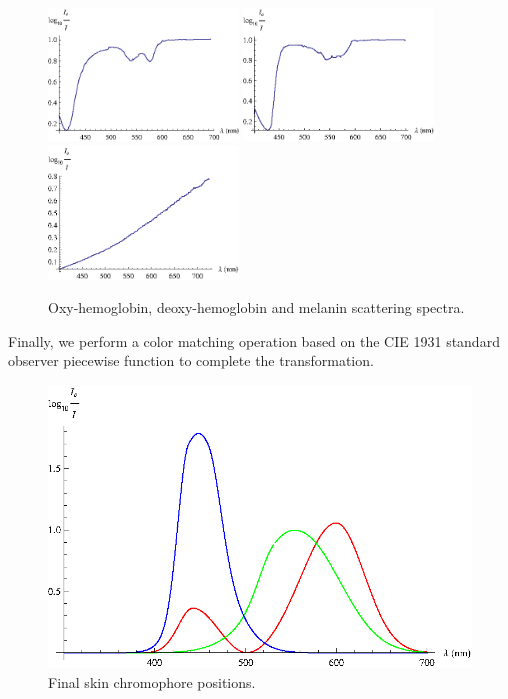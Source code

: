 \begin{figure}[h!]
  \caption{Oxy-hemoglobin, deoxy-hemoglobin and melanin scattering spectra.}\label{fig:scat}
  \centering
    \includegraphics[width=0.45\textwidth]{Chapter2/Figs/scatOxyHemo.eps}
    \includegraphics[width=0.45\textwidth]{Chapter2/Figs/scatDeoxyHemo.eps}
    \includegraphics[width=0.45\textwidth]{Chapter2/Figs/scatMelanin.eps}
\end{figure}

Finally, we perform a color matching operation based on the CIE 1931 standard observer piecewise function to complete the transformation.

\begin{figure}[h!]
  \caption{Final skin chromophore positions.}\label{fig:colorBasis}
  \centering
    \includegraphics[width=\textwidth]{Chapter2/Figs/colorBasis.eps}
\end{figure}


